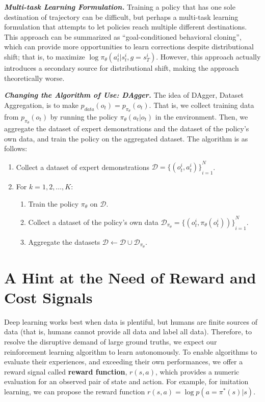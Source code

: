\textbf{\textit{Multi-task Learning Formulation.}}
Training a policy that has one sole destination of trajectory can be difficult, but perhaps a multi-task learning formulation that attempts to let policies reach multiple different destinations.
This approach can be summarized as ``goal-conditioned behavioral cloning'', which can provide more opportunities to learn corrections despite distributional shift; that is, to maximize $\log \pi_\theta (a_t^i | s_t^i, g = s_T^i)$.
However, this approach actually introduces a secondary source for distributional shift, making the approach theoretically worse.

\textbf{\textit{Changing the Algorithm of Use: DAgger.}}
The idea of DAgger, Dataset Aggregation, is to make $p_{data}(o_t) = p_{\pi_\theta}(o_t)$.
That is, we collect training data from $p_{\pi_\theta}(o_t)$ by running the policy $\pi_\theta (a_t | o_t)$ in the environment.
Then, we aggregate the dataset of expert demonstrations and the dataset of the policy's own data, and train the policy on the aggregated dataset.
The algorithm is as follows:
\begin{enumerate}
    \item Collect a dataset of expert demonstrations $\mathcal{D} = {\{(o_t^i, a_t^i)\}}_{i=1}^N$.
    \item For $k = 1, 2, \ldots, K$:
    \begin{enumerate}
        \item Train the policy $\pi_\theta$ on $\mathcal{D}$.
        \item Collect a dataset of the policy's own data $\mathcal{D}_{\pi_\theta} ={ \{(o_t^i, \pi_\theta (o_t^i))\}}_{i=1}^N$.
        \item Aggregate the datasets $\mathcal{D} \leftarrow \mathcal{D} \cup \mathcal{D}_{\pi_\theta}$.
    \end{enumerate}
\end{enumerate}

\section{A Hint at the Need of Reward and Cost Signals}
Deep learning works best when data is plentiful, but humans are finite sources of data (that is, humans cannot provide all data and label all data).
Therefore, to resolve the disruptive demand of large ground truths, we expect our reinforcement learning algorithm to learn autonomously.
To enable algorithms to evaluate their experiences, and exceeding their own performances, we offer a reward signal called \textbf{reward function}, $r(s, a)$, which provides a numeric evaluation for an observed pair of state and action.
For example, for imitation learning, we can propose the reward function $r(s, a) = \log p(a = \pi^*(s) | s)$.
